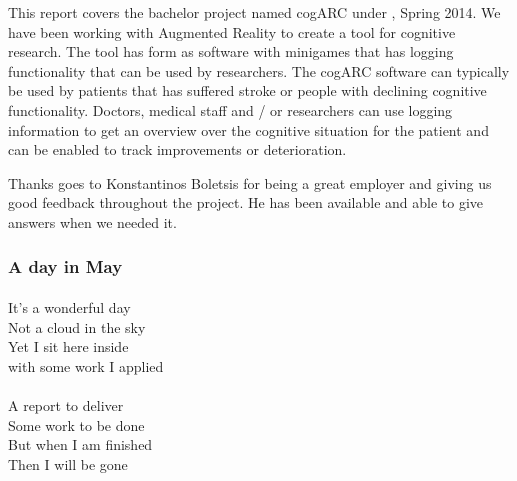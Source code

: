 This report covers the bachelor project named cogARC under \GUC{}, Spring 2014. We have been working with \gls{Augmented
Reality} to create a tool for cognitive research. The tool has form as software 
with minigames that has logging functionality that can be used by researchers. 
The cogARC software can typically be used by patients that has suffered stroke
or people with declining cognitive functionality. Doctors, medical staff and / or
researchers can use logging information to get an overview over the cognitive
situation for the patient and can be enabled to track improvements or
deterioration.


Thanks goes to Konstantinos Boletsis for being a great employer and giving us good feedback
throughout the project. He has been available and able to give answers when we
needed it.


\vfill{}

\begin{center}
	
	\subsubsection{A day in May}
	\paragraph{}

	It's a wonderful day\\
	Not a cloud in the sky\\
	Yet I sit here inside\\
	with some work I applied\\

	\paragraph{}

	A report to deliver\\
	Some work to be done\\
	But when I am finished\\
	Then I will be gone\\

\end{center}

\vfill{}
